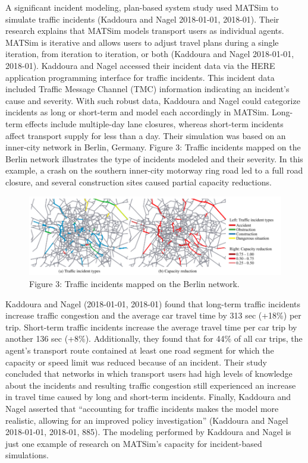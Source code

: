 \documentclass[
  letterpaper,
  DIV=11,
  numbers=noendperiod]{scrreprt}
\begin{document}
A significant incident modeling, plan-based system study used MATSim to
simulate traffic incidents (Kaddoura and Nagel 2018-01-01, 2018-01).
Their research explains that MATSim models transport users as individual
agents. MATSim is iterative and allows users to adjust travel plans
during a single iteration, from iteration to iteration, or both
(Kaddoura and Nagel 2018-01-01, 2018-01). Kaddoura and Nagel accessed
their incident data via the HERE application programming interface for
traffic incidents. This incident data included Traffic Message Channel
(TMC) information indicating an incident's cause and severity. With such
robust data, Kaddoura and Nagel could categorize incidents as long or
short-term and model each accordingly in MATSim. Long-term effects
include multiple-day lane closures, whereas short-term incidents affect
transport supply for less than a day. Their simulation was based on an
inner-city network in Berlin, Germany. Figure 3: Traffic incidents
mapped on the Berlin network illustrates the type of incidents modeled
and their severity. In this example, a crash on the southern inner-city
motorway ring road led to a full road closure, and several construction
sites caused partial capacity reductions.

\begin{figure}

{\centering \includegraphics{figures/fig3.png}

}

\caption{Figure 3: Traffic incidents mapped on the Berlin network.}

\end{figure}

Kaddoura and Nagel (2018-01-01, 2018-01) found that long-term traffic
incidents increase traffic congestion and the average car travel time by
313 sec (+18\%) per trip. Short-term traffic incidents increase the
average travel time per car trip by another 136 sec (+8\%).
Additionally, they found that for 44\% of all car trips, the agent's
transport route contained at least one road segment for which the
capacity or speed limit was reduced because of an incident. Their study
concluded that networks in which transport users had high levels of
knowledge about the incidents and resulting traffic congestion still
experienced an increase in travel time caused by long and short-term
incidents. Finally, Kaddoura and Nagel asserted that ``accounting for
traffic incidents makes the model more realistic, allowing for an
improved policy investigation'' (Kaddoura and Nagel 2018-01-01, 2018-01,
885). The modeling performed by Kaddoura and Nagel is just one example
of research on MATSim's capacity for incident-based simulations.
\end{document}
